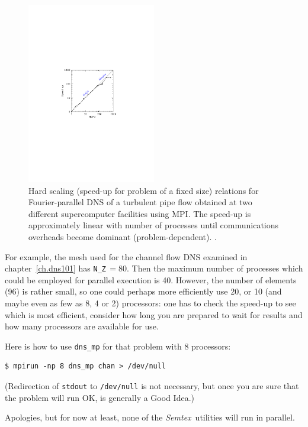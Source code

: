 \documentclass[11pt]{report}
\newcommand{\Semtex}{\emph{Semtex}} \newcommand{\Dog}{\emph{Dog}}
\begin{document}
\begin{figure}
\begin{center}
  \includegraphics[width=0.5\textwidth]{HardScaling}
\end{center}
\caption{Hard scaling (speed-up for problem of a fixed size) relations
  for Fourier-parallel DNS of a turbulent pipe flow obtained at two
  different supercomputer facilities using MPI. The speed-up is
  approximately linear with number of processes until communications
  overheads become dominant (problem-dependent).  \citep[Reproduced
    from][]{blas19}.}
\label{fig:scaling}
\end{figure}

For example, the mesh used for the channel flow DNS examined in
chapter~\ref{ch.dns101} has \verb|N_Z|\,$=80$.  Then the maximum
number of processes which could be employed for parallel execution is
40.  However, the number of elements (96) is rather small, so one
could perhaps more efficiently use 20, or 10 (and maybe even as few as
8, 4 or 2) processors: one has to check the speed-up to see which is
most efficient, consider how long you are prepared to wait for results
and how many processors are available for use.

Here is how to use \verb|dns_mp| for that problem with 8 processors:
{\small
\begin{verbatim}
$ mpirun -np 8 dns_mp chan > /dev/null
\end{verbatim}}
\noindent
(Redirection of \verb|stdout| to \verb|/dev/null| is not necessary,
but once you are sure that the problem will run OK, is generally a
Good Idea.)

Apologies, but for now at least, none of the \Semtex\ utilities will
run in parallel.
\end{document}
